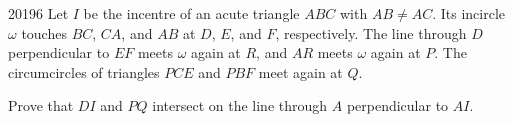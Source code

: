 \begin{problem}{2019}{6}
Let $I$ be the incentre of an acute triangle $ABC$ with $AB\ne AC$. Its incircle $\omega$ touches $BC$, $CA$, and $AB$ at $D$, $E$, and $F$, respectively. The line through $D$ perpendicular to $EF$ meets $\omega$ again at $R$, and $AR$ meets $\omega$ again at $P$. The circumcircles of triangles $PCE$ and $PBF$ meet again at $Q$.

Prove that $DI$ and $PQ$ intersect on the line through $A$ perpendicular to $AI$.
\end{problem}
